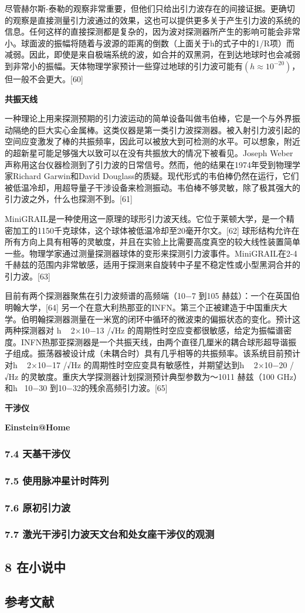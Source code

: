 尽管赫尔斯-泰勒的观察非常重要，但他们只给出引力波存在的间接证据。更确切的观察是直接测量引力波通过的效果，这也可以提供更多关于产生引力波的系统的信息。任何这样的直接探测都是复杂的，因为波对探测器所产生的影响可能会非常小。球面波的振幅将随着与波源的距离的倒数（上面关于h的式子中的1/R项）而减弱。因此，即使是来自极端系统的波，如合并的双黑洞，在到达地球时也会减弱到非常小的振幅。天体物理学家预计一些穿过地球的引力波可能有$(h \approx 10^{-20})$，但一般不会更大。[60]

\textbf{共振天线}

一种理论上用来探测预期的引力波运动的简单设备叫做韦伯棒，它是一个与外界振动隔绝的巨大实心金属棒。这类仪器是第一类引力波探测器。被入射引力波引起的空间应变激发了棒的共振频率，因此可以被放大到可检测的水平。可以想象，附近的超新星可能足够强大以致可以在没有共振放大的情况下被看见。Joseph Weber声称用这台仪器检测到了引力波的日常信号。然而，他的结果在1974年受到物理学家Richard Garwin和David Douglass的质疑。现代形式的韦伯棒仍然在运行，它们被低温冷却，用超导量子干涉设备来检测振动。韦伯棒不够灵敏，除了极其强大的引力波之外，什么也探测不到。[61]

MiniGRAIL是一种使用这一原理的球形引力波天线。它位于莱顿大学，是一个精密加工的1150千克球体，这个球体被低温冷却至20毫开尔文。[62] 球形结构允许在所有方向上具有相等的灵敏度，并且在实验上比需要高度真空的较大线性装置简单一些。物理学家通过测量探测器球体的变形来探测引力波事件。MiniGRAIL在2-4千赫兹的范围内非常敏感，适用于探测来自旋转中子星不稳定性或小型黑洞合并的引力波。[63]

目前有两个探测器聚焦在引力波频谱的高频端（10−7 到105 赫兹）：一个在英国伯明翰大学，[64] 另一个在意大利热那亚的INFN。第三个正被建造于中国重庆大学。伯明翰探测器测量在一米宽的闭环中循环的微波束的偏振状态的变化。预计这两种探测器对 h ~ 2×10−13 /√Hz 的周期性时空应变都很敏感，给定为振幅谱密度。INFN热那亚探测器是一个共振天线，由两个直径几厘米的耦合球形超导谐振子组成。振荡器被设计成（未耦合时）具有几乎相等的共振频率。该系统目前预计对h ~ 2×10−17 /√Hz 的周期性时空应变具有敏感性，并期望达到h ~ 2×10−20 /√Hz 的灵敏度。重庆大学探测器计划探测预计典型参数为～1011 赫兹（100 GHz）和h ~10−30 到10−32的残余高频引力波。[65]

\textbf{干涉仪}

\textbf{Einstein@Home}

\subsubsection{7.4 天基干涉仪}

\subsubsection{7.5 使用脉冲星计时阵列}

\subsubsection{7.6 原初引力波}

\subsubsection{7.7 激光干涉引力波天文台和处女座干涉仪的观测}

\subsection{8 在小说中}

\subsection{参考文献}